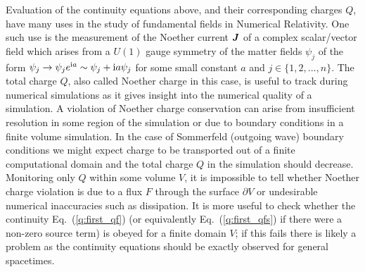 Evaluation of the continuity equations above, and their corresponding charges ${Q}$, have many uses in the study of fundamental fields in Numerical Relativity. One such use is the measurement of the Noether current $\boldsymbol{J}$ of a complex scalar/vector field which arises from a $U(1)$ gauge symmetry of the matter fields $\psi_j$ of the form $\psi_j \rightarrow \psi_j e^{\mathrm{i}a} \sim \psi_j +
{\rm i} a \psi_j$ for some small constant $a$ and $j \in \{1,2,...,n\}$. The total charge $Q$, also called Noether charge in this case, is useful to track during numerical simulations as it gives insight into the numerical quality of a simulation. A violation of Noether charge conservation can arise from insufficient resolution in some region of the simulation or due to boundary conditions in a finite volume simulation. In the case of Sommerfeld (outgoing wave) boundary conditions \cite{Alcubierre:2002kk} we might expect charge to be transported out of a finite computational domain and the total charge $Q$ in the simulation should decrease. Monitoring only ${Q}$ within some volume $V$, it is impossible to tell whether Noether charge violation is due to a flux ${F}$ through the surface $\partial V$ or undesirable numerical inaccuracies such as dissipation. It is more useful to check whether the continuity Eq.~(\ref{q:first_qf}) (or equivalently Eq.~(\ref{q:first_qfs}) if there were a non-zero source term) is obeyed for a finite domain $V$; if this fails there is likely a problem as the continuity equations should be exactly observed for general spacetimes.

